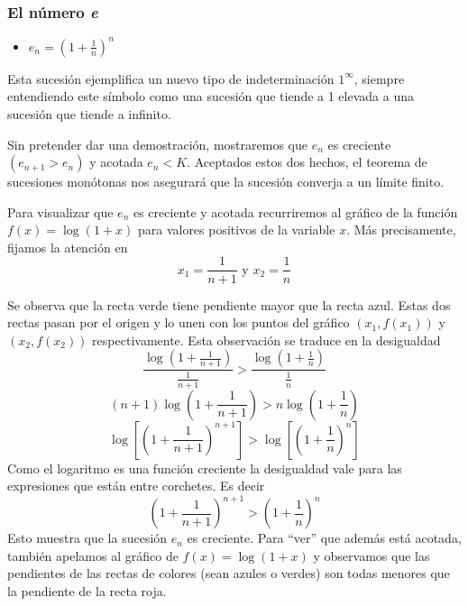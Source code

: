 \documentclass[../Teoría.root.tex]{subfiles}
\begin{document}
\subsubsection{El número \textit{e}}
\begin{itemize}
    \item \(e_n=\left(1+\frac{1}{n}\right)^n\)
\end{itemize}
Esta sucesión ejemplifica un nuevo tipo de indeterminación \(1^\infty\), siempre entendiendo este símbolo como una sucesión que tiende a 1 elevada a una sucesión que tiende a infinito.

Sin pretender dar una demostración, mostraremos que \(e_n\) es creciente \((e_{n+1}>e_n)\) y acotada \(e_n<K\).
Aceptados estos dos hechos, el teorema de sucesiones monótonas nos asegurará que la sucesión converja a un límite finito.

Para visualizar que \(e_n\) es creciente y acotada recurriremos al gráfico de la función \(f(x)=\log(1+x)\) para valores positivos de la variable \(x\).
Más precisamente, fijamos la atención en \[x_1=\frac{1}{n+1}\text{ y }x_2=\frac{1}{n}\]
\begin{center}
    \begin{scaletikzpicturetowidth}{\linewidth}
    \end{scaletikzpicturetowidth}
\end{center}
Se observa que la recta verde tiene pendiente mayor que la recta azul.
Estas dos rectas pasan por el origen y lo unen con los puntos del gráfico \((x_1,f(x_1))\) y \((x_2,f(x_2))\) respectivamente.
Esta observación se traduce en la desigualdad
\[\frac{\log\left(1+\frac{1}{n+1}\right)}{\frac{1}{n+1}}>\frac{\log\left(1+\frac{1}{n}\right)}{\frac{1}{n}}\]
\[(n+1)\log\left(1+\frac{1}{n+1}\right)>n\log\left(1+\frac{1}{n}\right)\]
\[\log\left[\left(1+\frac{1}{n+1}\right)^{n+1}\right]>\log\left[\left(1+\frac{1}{n}\right)^n\right]\]
Como el logaritmo es una función creciente la desigualdad vale para las expresiones que están entre corchetes.
Es decir \[\left(1+\frac{1}{n+1}\right)^{n+1}>\left(1+\frac{1}{n}\right)^n\]
Esto muestra que la sucesión \(e_n\) es creciente.
Para “ver” que además está acotada, también apelamos al gráfico de \(f(x)=\log(1+x)\) y observamos que las pendientes de las rectas de colores (sean azules o verdes) son todas menores que la pendiente de la recta roja.
\end{document}
